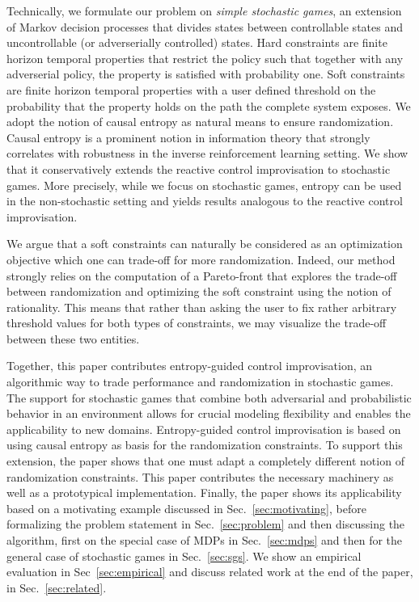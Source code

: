 Technically, we formulate our problem on \emph{simple stochastic
games}, an extension of Markov decision processes that divides states
between controllable states and uncontrollable (or adverserially
controlled) states. Hard constraints are finite horizon temporal
properties that restrict the policy such that together with any
adverserial policy, the property is satisfied with probability
one. Soft constraints are finite horizon temporal properties with a
user defined threshold on the probability that the property holds on
the path the complete system exposes.  We adopt the notion of causal
entropy as natural means to ensure randomization. Causal entropy is a
prominent notion in information theory that strongly correlates with
robustness in the inverse reinforcement learning setting. We show that
it conservatively extends the reactive control improvisation to
stochastic games. More precisely, while we focus on stochastic games,
entropy can be used in the non-stochastic setting and yields results
analogous to the reactive control improvisation.

We argue that a soft constraints can naturally be considered as an
optimization objective which one can trade-off for more randomization.
Indeed, our method strongly relies on the computation of a
Pareto-front that explores the trade-off between randomization and
optimizing the soft constraint using the notion of rationality. This
means that rather than asking the user to fix rather arbitrary
threshold values for both types of constraints, we may visualize the
trade-off between these two entities.

Together, this paper contributes entropy-guided control improvisation, an algorithmic way to trade performance and randomization in stochastic games. 
The support for stochastic games that combine both adversarial and probabilistic behavior in an environment allows for crucial modeling flexibility and enables the applicability to new domains. 
Entropy-guided control improvisation is based on using causal entropy as basis for the randomization constraints.
To support this extension, the paper shows that one must adapt a completely different notion of randomization constraints. This paper contributes the necessary machinery as well as a prototypical implementation.
Finally, the paper shows its applicability based on a motivating example discussed in Sec.~\ref{sec:motivating}, before formalizing the problem statement in Sec.~\ref{sec:problem} and then discussing the algorithm, first on the special case of MDPs in Sec.~\ref{sec:mdps} and then for the general case of stochastic games in Sec.~\ref{sec:sgs}. 
We show an empirical evaluation in Sec~\ref{sec:empirical} and discuss related work at the end of the paper, in Sec.~\ref{sec:related}.

